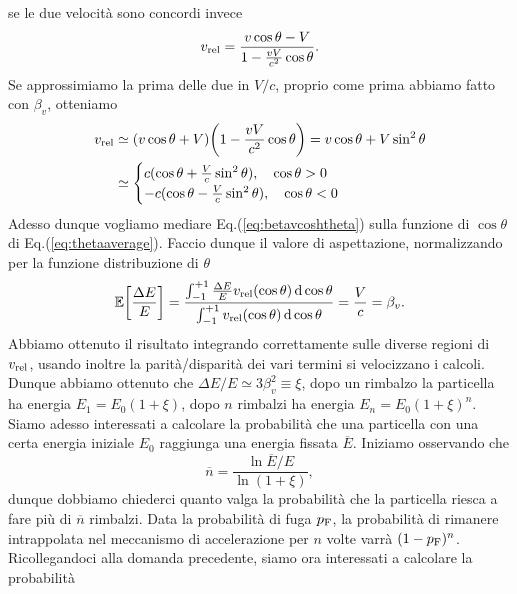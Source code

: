 se le due velocità sono concordi invece
\begin{equation*}
    v_\textup{rel} = \frac{v\cos \theta - V}{1 - \frac{vV}{c^2}\cos \theta}.
\end{equation*}
Se approssimiamo la prima delle due in $V/c$, proprio come prima abbiamo fatto con $\beta_v$, otteniamo
\begin{equation}
    \begin{split}
        v_\textup{rel} & \simeq (v\cos \theta + V)\biggl(1 - \frac{vV}{c^2} \cos \theta \biggr) = v \cos \theta + V \sin^2 \theta \label{eq:thetaaverage} \\
                       & \simeq 
                        \begin{cases}
                            c (\cos \theta + \frac{V}{c} \sin^2 \theta), \quad \cos \theta > 0 \\
                            - c (\cos \theta - \frac{V}{c} \sin^2 \theta), \quad \cos \theta < 0
                        \end{cases}
    \end{split}
\end{equation}
Adesso dunque vogliamo mediare Eq.(\ref{eq:betavcoshtheta}) sulla funzione di $\cos\theta$ di Eq.(\ref{eq:thetaaverage}). Faccio dunque il valore di aspettazione, normalizzando per la funzione distribuzione di $\theta$
\begin{equation*}
    \mathbb{E}\biggl[\frac{\Delta E}{E}\biggr] = \frac{\int_{-1}^{+1}\frac{\Delta E}{E} v_\textup{rel}(\cos \theta) \operatorname{d} \cos \theta}{\int_{-1}^{+1}v_\textup{rel}(\cos \theta) \operatorname{d} \cos \theta} = \frac{V}{c} = \beta_v.
\end{equation*}
Abbiamo ottenuto il risultato integrando correttamente sulle diverse regioni di $v_\textup{rel}$, usando inoltre la parità/disparità dei vari termini si velocizzano i calcoli. Dunque abbiamo ottenuto che $\Delta E / E \simeq 3 \beta_v^2 \equiv \xi $, dopo un rimbalzo la particella ha energia $E_1 = E_0 (1 + \xi)$, dopo $n$ rimbalzi ha energia $E_n = E_0 (1 + \xi)^n$. Siamo adesso interessati a calcolare la probabilità che una particella con una certa energia iniziale $E_0$ raggiunga una energia fissata $\overline{E}$. Iniziamo osservando che 
\begin{equation}
    \overline{n} = \frac{\ln \overline{E} / E}{\ln (1+ \xi)},\label{eq:overline_n}
\end{equation}
dunque dobbiamo chiederci quanto valga la probabilità che la particella riesca a fare più di $\overline{n}$ rimbalzi. Data la probabilità di fuga $p_\textup{F}$, la probabilità di rimanere intrappolata nel meccanismo di accelerazione per $n$ volte varrà $(1 - p_\textup{F})^n$. Ricollegandoci alla domanda precedente, siamo ora interessati a calcolare la probabilità 
